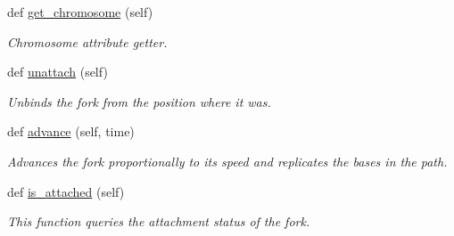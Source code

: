 \begin{DoxyCompactItemize}
def \mbox{\hyperlink{classReDyMo_1_1src_1_1replication__fork_1_1ReplicationFork_a65ec2334d2e80c8b204670a63219e5b9}{get\+\_\+chromosome}} (self)
\begin{DoxyCompactList}\small\item\em Chromosome attribute getter. \end{DoxyCompactList}\item 
def \mbox{\hyperlink{classReDyMo_1_1src_1_1replication__fork_1_1ReplicationFork_a093632b2000c853a2a7c5312c6c6916b}{unattach}} (self)
\begin{DoxyCompactList}\small\item\em Unbinds the fork from the position where it was. \end{DoxyCompactList}\item 
def \mbox{\hyperlink{classReDyMo_1_1src_1_1replication__fork_1_1ReplicationFork_acda54ba4aba3f2a9c02036626e20aa73}{advance}} (self, time)
\begin{DoxyCompactList}\small\item\em Advances the fork proportionally to its speed and replicates the bases in the path. \end{DoxyCompactList}\item 
def \mbox{\hyperlink{classReDyMo_1_1src_1_1replication__fork_1_1ReplicationFork_a20750a4ee72864cc2f7126e53fd06410}{is\+\_\+attached}} (self)
\begin{DoxyCompactList}\small\item\em This function queries the attachment status of the fork. \end{DoxyCompactList}\end{DoxyCompactItemize}
